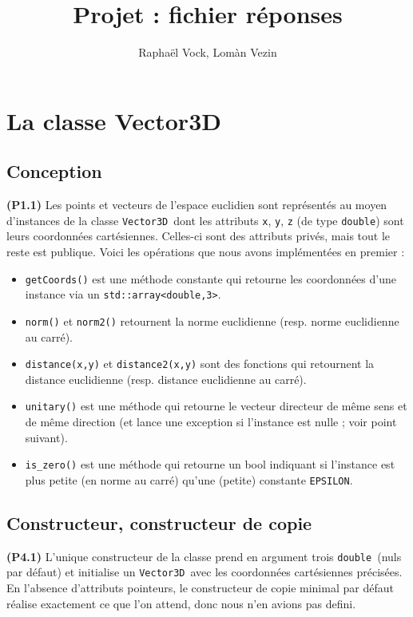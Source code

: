 \documentclass[12pt, letterpaper, twoside]{article}
\title{Projet : fichier réponses}
\author{Raphaël Vock, Lomàn Vezin}
\newcommand{\T}[1]{\texttt{#1}}
\newcommand{\V}[0]{\texttt{Vector3D}}
\newcommand{\double}{\texttt{double}}
\begin{document}
\maketitle
\section{La classe Vector3D}
\subsection{Conception}
\noindent \textbf{(P1.1)} Les points et vecteurs de l'espace euclidien sont représentés au moyen d'instances de la classe \V\ dont les attributs \T{x}, \T{y}, \T{z} (de type \double) sont leurs coordonnées cartésiennes. Celles-ci sont des attributs privés, mais tout le reste est publique. Voici les opérations que nous avons implémentées en premier :

\begin{itemize}

\item \T{getCoords()}  est une méthode constante qui retourne les coordonnées d'une instance via un \T{std::array<double,3>}.

\item \T{norm()} et \T{norm2()} retournent la norme euclidienne (resp. norme euclidienne au carré).

\item \T{distance(x,y)} et \T{distance2(x,y)} sont des fonctions qui retournent la distance euclidienne (resp. distance euclidienne au carré).

\item \T{unitary()} est une méthode qui retourne le vecteur directeur de même sens et de même direction (et lance une exception si l'instance est nulle ; voir point suivant).

\item \T{is\_zero()} est une méthode qui retourne un bool indiquant si l'instance est plus petite (en norme au carré) qu'une (petite) constante \T{EPSILON}. 
\end{itemize}

\subsection{Constructeur, constructeur de copie}
\noindent \textbf{(P4.1)} L'unique constructeur de la classe prend en argument trois \double\ (nuls par défaut) et initialise un \V\ avec les coordonnées cartésiennes précisées. En l'absence d'attributs pointeurs, le constructeur de copie minimal par défaut réalise exactement ce que l'on attend, donc nous n'en avions pas defini.
\end{document}
